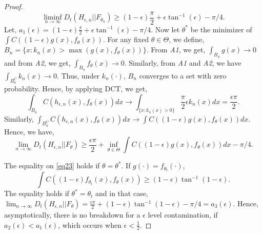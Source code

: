 \documentclass{article}
\begin{document}
\begin{proof}
\begin{equation}
    \liminf_{n \to \infty} D_t(H_{\epsilon,n}||F_{\theta_n}) \geq (1-\epsilon) \frac{\pi}{2}+\epsilon \tan^{-1} (\epsilon)-\pi/4.
\end{equation}
Let, $a_1(\epsilon)=(1-\epsilon) \frac{\pi}{2}+\epsilon \tan^{-1} (\epsilon)-\pi/4$.
Now let $\theta^*$ be the minimizer of $\int C((1-\epsilon)g(x),f_\theta(x))$. For any fixed $\theta \in \Theta$, we define, $B_n=\{x: k_n(x) > \max(g(x),f_\theta(x))\}$. From \textit{A1}, we get, $\int_{B_n} g(x) \to 0$ and from \textit{A2}, we get, $\int_{B_n} f_\theta(x) \to 0$. Similarly, from \textit{A1} and \textit{A2}, we have $\int_{B_n^C} k_n(x) \to 0$. Thus, under $k_n(\cdot)$, $B_n$ converges to a set with zero probability. Hence, by applying DCT, we get,
\begin{equation}
    \int_{B_n} C(h_{\epsilon,n}(x),f_\theta(x))dx \to \int_{\{x:k_n(x) > 0\}} \frac{\pi}{2} \epsilon k_n(x)dx=\frac{\epsilon \pi}{2}.
\end{equation}
Similarly, {\small $\int_{B_n^C} C(h_{\epsilon,n}(x),f_\theta(x))dx \to \int C((1-\epsilon)g(x),f_\theta(x))dx.   $}
 Hence, we have, 
\begin{equation}
\label{eq23}
    \lim_{n \to \infty} D_t(H_{\epsilon,n}||F_{\theta}) \geq \frac{\epsilon \pi}{2}+\inf_{\theta \in \Theta} \int C((1-\epsilon)g(x),f_\theta(x))dx - \pi/4.
\end{equation}

The equality on \eqref{eq23} holds if $\theta=\theta^*$. If $g(\cdot)=f_{\theta_t}(\cdot)$,
\begin{equation}
    \int C((1-\epsilon)f_{\theta_t}(x),f_\theta(x)) \geq (1-\epsilon) \tan^{-1}(1-\epsilon).
\end{equation}
The equality holds if $\theta^*=\theta_t$ and in that case, $\lim_{n \to \infty} D_t(H_{\epsilon,n}||F_\theta)=\frac{\epsilon \pi}{2}+ (1-\epsilon) \tan^{-1}(1-\epsilon)-\pi/4=a_3(\epsilon).$
Hence, asymptotically, there is no breakdown for a $\epsilon$ level contamination, if $a_2(\epsilon) < a_1(\epsilon)$, which occurs when $\epsilon<\frac{1}{2}.$ 
\end{proof}
\end{document}
